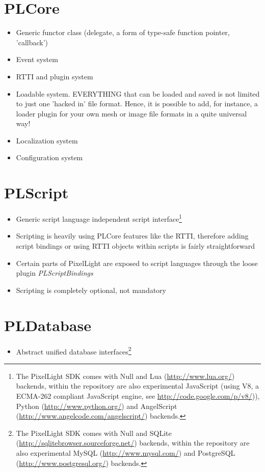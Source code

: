 \section{PLCore}
\begin{itemize}
\item{Generic functor class (delegate, a form of type-safe function pointer, 'callback')}
\item{Event system}
\item{RTTI and plugin system}
\item{Loadable system. EVERYTHING that can be loaded and saved is not limited to just one 'hacked in' file format. Hence, it is possible to add, for instance, a loader plugin for your own mesh or image file formats in a quite universal way!}
\item{Localization system}
\item{Configuration system}
\end{itemize}




\section{PLScript}
\begin{itemize}
\item{Generic script language independent script interface\footnote{The PixelLight SDK comes with Null and Lua (\url{http://www.lua.org/}) backends, within the repository are also experimental JavaScript (using V8, a ECMA-262 compliant JavaScript engine, see \url{http://code.google.com/p/v8/})), Python (\url{http://www.python.org/}) and AngelScript (\url{http://www.angelcode.com/angelscript/}) backends.}}
\item{Scripting is heavily using PLCore features like the RTTI, therefore adding script bindings or using RTTI objects within scripts is fairly straightforward}
\item{Certain parts of PixelLight are exposed to script languages through the loose plugin \emph{PLScriptBindings}}
\item{Scripting is completely optional, not mandatory}
\end{itemize}




\section{PLDatabase}
\begin{itemize}
\item{Abstract unified database interfaces\footnote{The PixelLight SDK comes with Null and SQLite (\url{http://sqlitebrowser.sourceforge.net/}) backends, within the repository are also experimental MySQL (\url{http://www.mysql.com/}) and PostgreSQL (\url{http://www.postgresql.org/}) backends.}}
\end{itemize}




